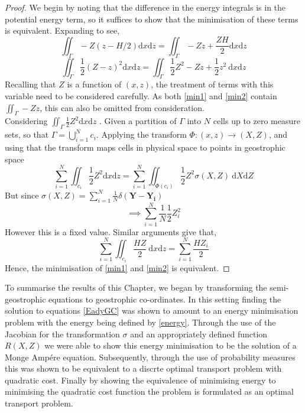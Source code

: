 \begin{proof}
	We begin by noting that the difference in the energy integrals is in the potential energy term, so it suffices to show that the minimisation of these terms is equivalent. Expanding to see,
	\begin{equation}
	\iint_{\Gamma} - Z\left(z - H/2\right)\textrm{d}x\textrm{d}z = \iint_{\Gamma} - Zz + \frac{ZH}{2}\textrm{d}x\textrm{d}z
	\label{min1}
	\end{equation} 
	\begin{equation}
	\iint_{\Gamma} \frac{1}{2}\left(Z - z\right)^2\textrm{d}x\textrm{d}z = \iint_{\Gamma} \frac{1}{2}Z^2 - Zz + \frac{1}{2} z^2 \ \textrm{d}x\textrm{d}z
	\label{min2}  
	\end{equation}
	Recalling that $Z$ is a function of $(x,z)$, the treatment of terms with this variable need to be considered carefully. As both \ref{min1} and \ref{min2} contain $\iint_{\Gamma} - Zz$, this can also be omitted from consideration.\\
	\linebreak
	Considering $\iint_{\Gamma} \frac{1}{2}Z^2\textrm{d}x\textrm{d}z$ . Given a partition of $\Gamma$ into $N$ cells up to zero measure sets, so that $\Gamma = \bigcup_{i=1}^N c_i$. Applying the transform $\Phi: (x,z) \rightarrow (X,Z)$, and using that the transform maps cells in physical space to points in geostrophic space
	\begin{equation*}
		\sum_{i=1}^N \iint_{c_i} \frac{1}{2}Z^2\textrm{d}x\textrm{d}z = \sum_{i=1}^N \iint_{\Phi(c_i)} \frac{1}{2}Z^2\sigma(X,Z) \ \textrm{d}X\textrm{d}Z 
	\end{equation*}
	But since $\sigma(X,Z) = \sum_{i=1}^{N} \frac{1}{N} \delta(\bm{Y}-\bm{Y_i})$
	\begin{equation*}
		\implies \sum_{i=1}^N \frac{1}{N} \frac{1}{2}Z_i^2
	\end{equation*}
	However this is a fixed value. Similar arguments give that,
	\begin{equation*}
		\sum_{i=1}^N \iint_{c_i} \frac{HZ}{2} \ \textrm{d}x\textrm{d}z = \sum_{i=1}^N \frac{HZ_i}{2}
	\end{equation*}
	Hence, the minimisation of \ref{min1} and \ref{min2} is equivalent.
\end{proof}
To summarise the results of this Chapter, we began by transforming the semi-geostrophic equations to geostrophic co-ordinates. In this setting finding the solution to equations \ref{EadyGC} was shown to amount to an energy minimisation problem with the energy being defined by \ref{energy}. Through the use of the Jacobian for the transformation $\sigma$ and an appropriately defined function $R(X,Z)$ we were able to show this energy minimisation to be the solution of a Monge Amp\'{e}re equation. Subsequently, through the use of probability measures this was shown to be equivalent to a discrte optimal transport problem with quadratic cost. Finally by showing the equivalence of minimising energy to minimising the quadratic cost function the problem is formulated as an optimal transport problem.
